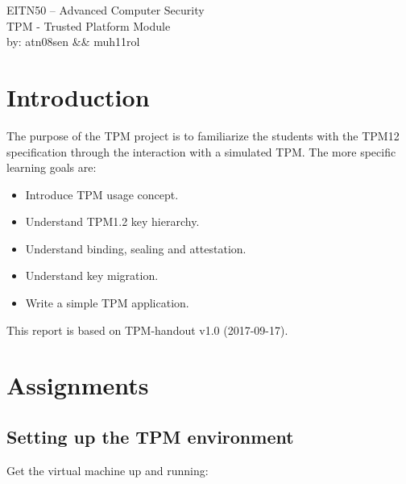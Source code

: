 \documentclass[10pt]{article}
\begin{document}

  \thispagestyle{empty}
  \vspace*{3cm}
  \begin{center}
    \huge{EITN50 -- Advanced Computer Security} \\
    \vspace{0.3cm}
    \LARGE{TPM - Trusted Platform Module} \\
    \vspace{1cm}
    \large{by: atn08sen \&\& muh11rol} \\
  \end{center}


  \newpage

  \section*{Introduction}

    The purpose of the TPM project is to familiarize the students with the
    TPM12 specification through the interaction with a simulated TPM. The more
    specific learning goals are:

    \begin{itemize}
      \item{Introduce TPM usage concept.}
      \item{Understand TPM1.2 key hierarchy.}
      \item{Understand binding, sealing and attestation.}
      \item{Understand key migration.}
      \item{Write a simple TPM application.}
    \end{itemize}

    This report is based on TPM-handout v1.0 (2017-09-17).

  \setcounter{section}{2}

  \section{Assignments}

    \subsection{Setting up the TPM environment}

      Get the virtual machine up and running:
\end{document}
